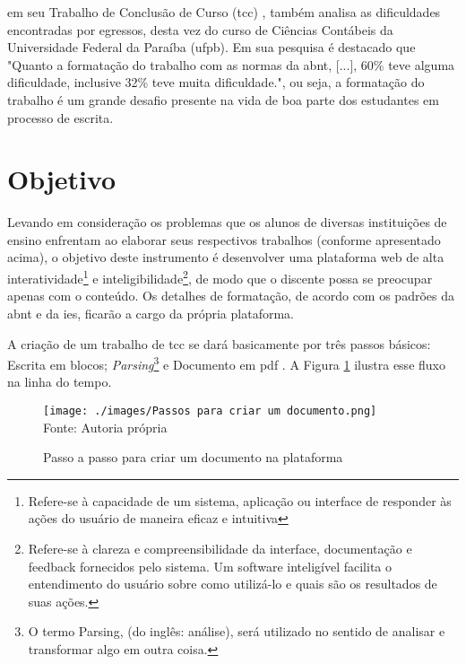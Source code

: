 \clearpage

\cite{santos}
em seu Trabalho de Conclusão de Curso
(\acrshort{tcc})
, também analisa as
dificuldades encontradas por egressos, desta vez do curso de Ciências Contábeis da
Universidade Federal da Paraíba
(\acrshort{ufpb}).
Em sua pesquisa é destacado que "Quanto a
formatação do trabalho com as normas da 
\acrshort{abnt}, {[}...{]}, 60\% teve alguma dificuldade, inclusive
32\% teve muita dificuldade.", ou seja, a formatação do trabalho é um grande desafio presente
na vida de boa parte dos estudantes em processo de escrita.

\section{Objetivo}

Levando em consideração os problemas que os alunos de diversas instituições de ensino enfrentam ao elaborar seus respectivos
trabalhos (conforme apresentado acima), o objetivo deste instrumento é desenvolver uma plataforma
\acrshort{web}
de alta
interatividade\footnote{Refere-se à capacidade de um sistema, aplicação ou interface de responder
        às ações do usuário de maneira eficaz e intuitiva}
e
inteligibilidade\footnote{Refere-se à clareza e compreensibilidade da interface, documentação e feedback fornecidos pelo
    sistema. Um software inteligível facilita o entendimento do usuário sobre como utilizá-lo e quais são os resultados de suas ações.},
de modo que o discente possa se preocupar apenas com o conteúdo. Os detalhes de formatação, de acordo com os padrões da
\acrshort{abnt}
e da
\acrshort{ies},
ficarão a cargo da própria plataforma.

A criação de um trabalho de
\acrshort{tcc}
se dará basicamente por três passos básicos: Escrita em blocos;
\textit{Parsing}\footnote{O termo Parsing, (do inglês: análise), será utilizado no
sentido de analisar e transformar algo em outra coisa.}
e
Documento em
\acrshort{pdf}
. A Figura \ref{fig:Passos para criar um documento} ilustra esse fluxo na linha do tempo.

\begin{figure}[H]
    \centering
    \caption{Passo a passo para criar um documento na plataforma}
    \texttt{[image: ./images/Passos para criar um documento.png]}
    \label{fig:Passos para criar um documento} \\
    \textnormal{\fontsize{10pt}{12pt}Fonte: Autoria própria}
\end{figure}

